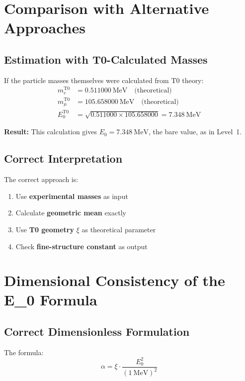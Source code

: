 	\section{Comparison with Alternative Approaches}
	
	\subsection{Estimation with T0-Calculated Masses}
	
	If the particle masses themselves were calculated from T0 theory:
	\begin{align}
		m_e^{\text{T0}} &= \SI{0.511000}{\MeV} \quad \text{(theoretical)} \\
		m_\mu^{\text{T0}} &= \SI{105.658000}{\MeV} \quad \text{(theoretical)} \\
		E_0^{\text{T0}} &= \sqrt{0.511000 \times 105.658000} = \SI{7.348}{\MeV}
	\end{align}
	
	\textbf{Result:} This calculation gives $E_0 = \SI{7.348}{\MeV}$, the bare value, as in Level~1.
	
	\subsection{Correct Interpretation}
	
	The correct approach is:
	\begin{enumerate}
		\item Use \textbf{experimental masses} as input
		\item Calculate \textbf{geometric mean} exactly  
		\item Use \textbf{T0 geometry} $\xi$ as theoretical parameter
		\item Check \textbf{fine-structure constant} as output
	\end{enumerate}
	
	\section{Dimensional Consistency of the E\_0 Formula}
	
	\subsection{Correct Dimensionless Formulation}
	
	The formula:
	\begin{equation}
		\alpha = \xi \cdot \frac{E_0^2}{( \SI{1}{\MeV} )^2}
	\end{equation}
	
